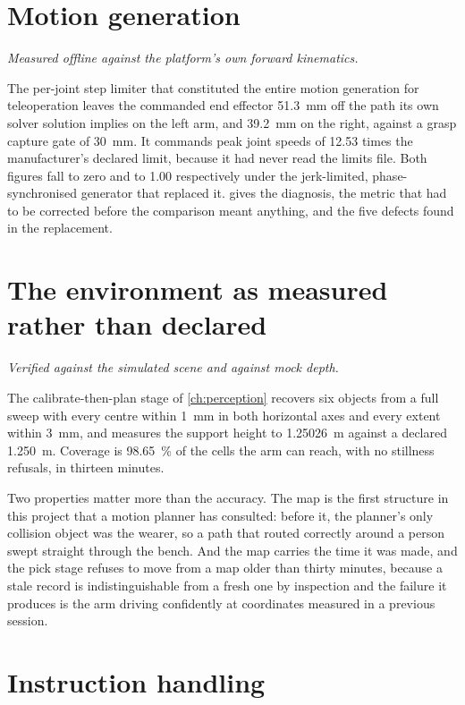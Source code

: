 \section{Motion generation}

\emph{Measured offline against the platform's own forward kinematics.}

The per-joint step limiter that constituted the entire motion generation for
teleoperation leaves the commanded end effector \SI{51.3}{\milli\metre} off
the path its own solver solution implies on the left arm, and
\SI{39.2}{\milli\metre} on the right, against a grasp capture gate of
\SI{30}{\milli\metre}. It commands peak joint speeds of \num{12.53} times the
manufacturer's declared limit, because it had never read the limits file. Both
figures fall to zero and to \num{1.00} respectively under the jerk-limited,
phase-synchronised generator that replaced it.  gives the
diagnosis, the metric that had to be corrected before the comparison meant
anything, and the five defects found in the replacement.

\section{The environment as measured rather than declared}

\emph{Verified against the simulated scene and against mock depth.}

The calibrate-then-plan stage of \cref{ch:perception} recovers six objects
from a full sweep with every centre within \SI{1}{\milli\metre} in both
horizontal axes and every extent within \SI{3}{\milli\metre}, and measures the
support height to \SI{1.25026}{\metre} against a declared
\SI{1.250}{\metre}. Coverage is \SI{98.65}{\percent} of the cells the arm can
reach, with no stillness refusals, in thirteen minutes.

Two properties matter more than the accuracy. The map is the first structure
in this project that a motion planner has consulted: before it, the planner's
only collision object was the wearer, so a path that routed correctly around a
person swept straight through the bench. And the map carries the time it was
made, and the pick stage refuses to move from a map older than thirty minutes,
because a stale record is indistinguishable from a fresh one by inspection and
the failure it produces is the arm driving confidently at coordinates measured
in a previous session.

\section{Instruction handling}
\label{sec:instruction-results}

